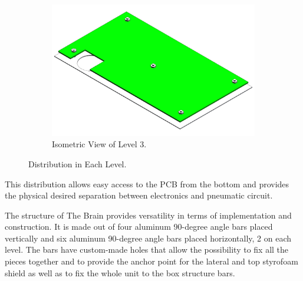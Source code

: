\begin{figure}[H]
\begin{subfigure}[b]{0.3\textwidth}
    \centering
    \includegraphics[width=\textwidth]{4-experiment-design/img/Mechanical/Level_3.png}
    \caption{Isometric View of Level 3.}
    \label{level_3}
    \end{subfigure}
    \caption{Distribution in Each Level.}
    \label{fig:The-brain}
\end{figure}

This distribution allows easy access to the PCB from the bottom and provides the physical desired separation between electronics and pneumatic circuit.


\smallskip
The structure of The Brain provides versatility in terms of implementation and construction. It is made out of four aluminum 90-degree angle bars placed vertically and six aluminum 90-degree angle bars placed horizontally, 2 on each level. The bars have custom-made holes that allow the possibility to fix all the pieces together and to provide the anchor point for the lateral and top styrofoam shield as well as to fix the whole unit to the box structure bars. %

